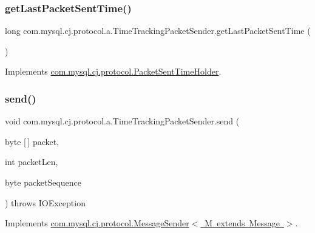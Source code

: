 \subsubsection{\texorpdfstring{get\+Last\+Packet\+Sent\+Time()}{getLastPacketSentTime()}}
{\footnotesize\ttfamily long com.\+mysql.\+cj.\+protocol.\+a.\+Time\+Tracking\+Packet\+Sender.\+get\+Last\+Packet\+Sent\+Time (\begin{DoxyParamCaption}{ }\end{DoxyParamCaption})}



Implements \mbox{\hyperlink{interfacecom_1_1mysql_1_1cj_1_1protocol_1_1_packet_sent_time_holder_a0f02a4b248787dd3852b5258a9aa5918}{com.\+mysql.\+cj.\+protocol.\+Packet\+Sent\+Time\+Holder}}.

\mbox{\label{classcom_1_1mysql_1_1cj_1_1protocol_1_1a_1_1_time_tracking_packet_sender_a5bb1efc7043c5417509cd079cc7abd0d}} 
\subsubsection{\texorpdfstring{send()}{send()}}
{\footnotesize\ttfamily void com.\+mysql.\+cj.\+protocol.\+a.\+Time\+Tracking\+Packet\+Sender.\+send (\begin{DoxyParamCaption}\item[{byte \mbox{[}$\,$\mbox{]}}]{packet,  }\item[{int}]{packet\+Len,  }\item[{byte}]{packet\+Sequence }\end{DoxyParamCaption}) throws I\+O\+Exception}



Implements \mbox{\hyperlink{interfacecom_1_1mysql_1_1cj_1_1protocol_1_1_message_sender_a0c7192449eae4aa0f0dbbc9778dac002}{com.\+mysql.\+cj.\+protocol.\+Message\+Sender$<$ M extends Message $>$}}.

\mbox{\label{classcom_1_1mysql_1_1cj_1_1protocol_1_1a_1_1_time_tracking_packet_sender_a5e29cda7005857f658352ef487c541ac}} 

